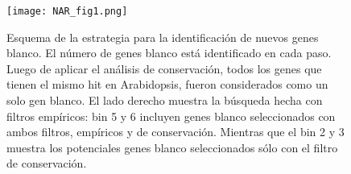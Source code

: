 \begin{figure}[htbp!] 
    \centering    
    \texttt{[image: NAR\_fig1.png]}
    \caption[Estrategia]{Esquema de la estrategia para la identificación de nuevos genes blanco. 
    El número de genes blanco está identificado en cada paso. 
    Luego de aplicar el análisis de conservación, todos los genes que tienen el mismo hit en Arabidopsis, fueron considerados como un solo gen blanco. 
    El lado derecho muestra la búsqueda hecha con filtros empíricos: bin 5 y 6 incluyen genes blanco seleccionados con ambos filtros, empíricos y de conservación.
    Mientras que el bin 2 y 3 muestra los potenciales genes blanco seleccionados sólo con el filtro de conservación.}
    \label{fig:NAR_fig1}
\end{figure}



